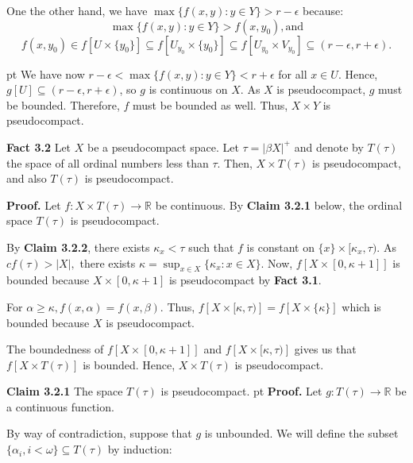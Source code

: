 \documentclass{article}
\begin{document}
\vskip 20pt

One the other hand, we have $\max\{f(x,y):y\in Y\}>r-\epsilon$ because:
$$\max\{f(x,y):y\in Y\}>f(x,y_0), \mbox{and}$$
 $$f(x,y_0)\in f\left[U\times \{y_0\}\right] \subseteq f\left[U_{y_0} \times \{y_0\}\right]
 \subseteq f\left[U_{y_0} \times V_{y_0}\right] \subseteq (r-\epsilon, r+\epsilon).$$


 pt
We have now $r-\epsilon<\max\{f(x,y):y\in Y\}<r+\epsilon$ for all $x\in U$. Hence, $g[U] \subseteq (r-\epsilon, r+\epsilon)$, so $g$ is continuous on $X$. 
As $X$ is pseudocompact, $g$ must be bounded. Therefore, $f$ must be bounded as well. 
Thus, $X\times Y$ is pseudocompact. 


\vskip 40pt


\textbf{Fact 3.2} Let $X$ be a pseudocompact space. Let $\tau=|\beta X|^+$ and denote by $T(\tau)$ the space of all ordinal numbers less than $\tau$.  Then,  $X\times T(\tau)$ is pseudocompact, and also $T(\tau)$ is pseudocompact.
\vskip 20pt


\textbf{Proof.} Let $f: X\times T(\tau)\rightarrow \mathbb{R}$ be continuous. \vskip 15pt
By \textbf{Claim 3.2.1} below, the ordinal space $T(\tau)$ is pseudocompact.
\vskip 10pt 

By \textbf{Claim 3.2.2}, there exists $\kappa_x<\tau$ such that $f$ is constant on $\{x\}\times [\kappa_x, \tau)$. 
As $cf(\tau)>|X|,$ there exists $\kappa=\sup_{x\in X} \{\kappa_x: x\in X\}.$ 
Now, $f\left[X\times [0,\kappa+1]\right]$ is bounded because $X\times [0,\kappa+1]$ is pseudocompact by \textbf{Fact 3.1}.\vskip 10pt

For $\alpha\geq \kappa, f(x,\alpha)=f(x,\beta).$ Thus, $f\left[X\times [\kappa,\tau)\right]=f\left[X\times\{\kappa\}\right]$ which is bounded because $X$ is pseudocompact. \vskip 10pt

The boundedness of $f\left[X\times [0,\kappa+1]\right]$ and $f\left[X\times [\kappa,\tau)\right]$ gives us that $f\left[X\times T(\tau)\right]$ is bounded. Hence, $X\times T(\tau)$ is pseudocompact.



\vskip 25pt










\textbf{Claim 3.2.1} The space $T(\tau)$ is pseudocompact.
 pt
\textbf{Proof.} Let $g: T(\tau) \rightarrow \mathbb{R}$ be a continuous function.


By way of contradiction, suppose that $g$ is unbounded. 
We will define the subset $\{\alpha_i, i<\omega\}\subseteq T(\tau)$ by induction: \vskip 10pt
\end{document}
